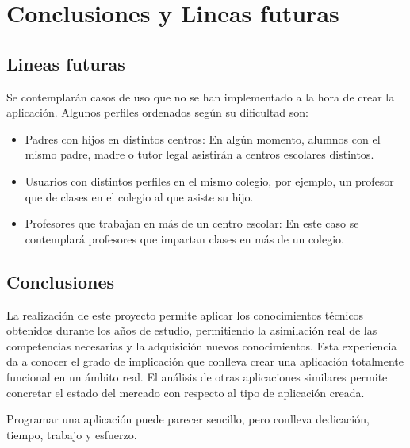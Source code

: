 %
%
%
%

\cleardoublepage
\chapter{Conclusiones y Lineas futuras}
\label{chap:conclusions}

	\section{Lineas futuras}
	
		Se contemplarán casos de uso que no se han implementado a la hora de crear la aplicación. Algunos perfiles ordenados según su dificultad son:
		
		\begin{itemize}
			\item Padres con hijos en distintos centros: En algún momento, alumnos con el mismo padre, madre o tutor legal asistirán a centros escolares distintos.
			\item Usuarios con distintos perfiles en el mismo colegio, por ejemplo, un profesor que de clases en el colegio al que asiste su hijo.
			\item Profesores que trabajan en más de un centro escolar: En este caso se contemplará profesores que impartan clases en más de un colegio.
		\end{itemize}
		
	\section{Conclusiones}
		La realización de este proyecto permite aplicar los conocimientos técnicos obtenidos durante los años de estudio, permitiendo la asimilación real de las competencias necesarias y la adquisición nuevos conocimientos.
		Esta experiencia da a conocer el grado de implicación que conlleva crear una aplicación totalmente funcional en un ámbito real. El análisis de otras aplicaciones similares permite concretar el estado del mercado con respecto al tipo de aplicación creada.
		
		\bigskip
		Programar una aplicación puede parecer sencillo, pero conlleva dedicación, tiempo, trabajo y esfuerzo.